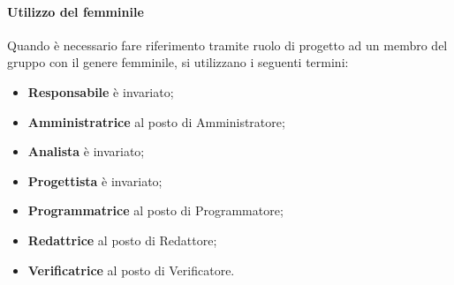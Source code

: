 \paragraph{Utilizzo del femminile}
Quando è necessario fare riferimento tramite ruolo di progetto ad un membro del gruppo con il genere femminile, si utilizzano i seguenti termini:
\begin{itemize}
  \item \textbf{Responsabile} è invariato;
  \item \textbf{Amministratrice} al posto di Amministratore;
  \item \textbf{Analista} è invariato;
  \item \textbf{Progettista} è invariato;
  \item \textbf{Programmatrice} al posto di Programmatore;
  \item \textbf{Redattrice} al posto di Redattore;
  \item \textbf{Verificatrice} al posto di Verificatore.
\end{itemize}

